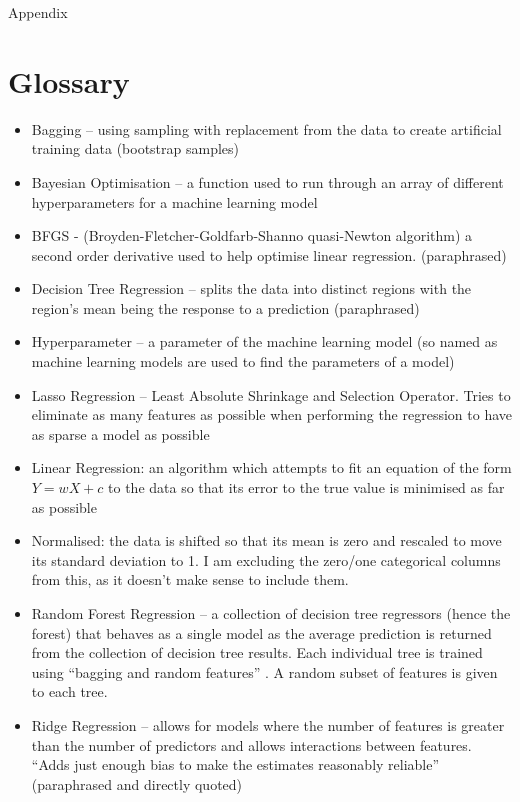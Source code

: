 \documentclass[a4paper,11pt]{article}
\begin{document}
Appendix

\section{Glossary}
\begin{itemize}
	\item Bagging – using sampling with replacement from the data to create artificial training data (bootstrap samples)
	\item Bayesian Optimisation – a function used to run through an array of different hyperparameters for a machine learning model
	\item BFGS - (Broyden-Fletcher-Goldfarb-Shanno quasi-Newton algorithm) a second order derivative used to help optimise linear regression.\citep{brownlee_gentle_2021} (paraphrased)
	\item Decision Tree Regression – splits the data into distinct regions with the region’s mean being the response to a prediction \citep{james_gareth_introduction_2021} (paraphrased)
	\item Hyperparameter – a parameter of the machine learning model (so named as machine learning models are used to find the parameters of a model)
	\item Lasso Regression – Least Absolute Shrinkage and Selection Operator. Tries to eliminate as many features as possible when performing the regression to have as sparse a model as possible \citep{stephanie_lasso_2015}
	\item Linear Regression: an algorithm which attempts to fit an equation of the form $Y = wX + c$ to the data so that its error to the true value is minimised as far as possible
	\item Normalised: the data is shifted so that its mean is zero and rescaled to move its standard deviation to 1. I am excluding the zero/one categorical columns from this, as it doesn’t make sense to include them.
	\item Random Forest Regression – a collection of decision tree regressors (hence the forest) that behaves as a single model as the average prediction is returned from the collection of decision tree results. Each individual tree is trained using “bagging and random features” \citep{schapire_robert_random_2001}. A random subset of features is given to each tree.
	\item Ridge Regression – allows for models where the number of features is greater than the number of predictors and allows interactions between features. “Adds just enough bias to make the estimates reasonably reliable” \citep{stephanie_ridge_2017} (paraphrased and directly quoted) 
\end{itemize}
\end{document}
